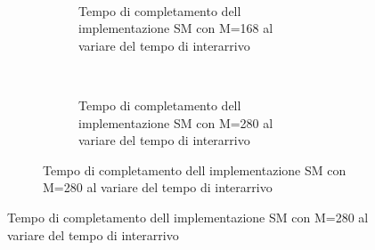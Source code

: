 \begin{figure}[p]
\begin{subfigure}[b]{.5\columnwidth}
\begin{subfigure}[b]{\textwidth}
    \end{subfigure}
    ~
    \begin{subfigure}[b]{\textwidth}
      \centering
      \addtocounter{subfigure}{-1}
      \renewcommand\thesubfigure{\alph{subfigure}2}
      \resizebox{\columnwidth}{!}{}
      \caption{Tempo di completamento dell implementazione SM con M=168 al variare del tempo di interarrivo}
      \label{fig:scalability_SM_size168}
    \end{subfigure}
    ~
    \begin{subfigure}[b]{\textwidth}
      \centering
      \addtocounter{subfigure}{-1}
      \renewcommand\thesubfigure{\alph{subfigure}3}
      \resizebox{\columnwidth}{!}{}
      \caption{Tempo di completamento dell implementazione SM con M=280 al variare del tempo di interarrivo}
      \label{fig:scalability_SM_size280}
    \end{subfigure}
    \label{fig:allscalability_SM}
  \end{subfigure}
\end{figure}

